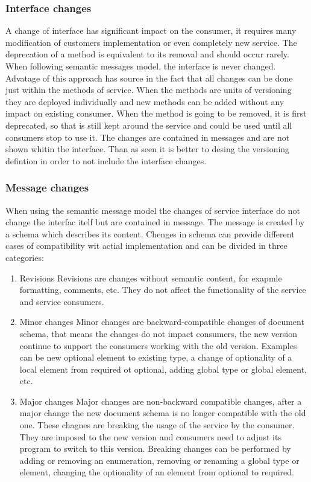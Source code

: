 \subsubsection{Interface changes}
A change of interface has significant impact on the consumer, it requires many modification of customers implementation or even completely new service. The deprecation of a method is equivalent to its removal and should occur rarely.
When following semantic messages model, the interface is never changed. Advatage of this approach has source in the fact that all changes can be done just within the methods of service. When the methods are units of versioning they are deployed individually and new methods can be added without any impact on existing consumer. When the method is going to be removed, it is first deprecated, so that is still kept around the service and could be used until all consumers stop to use it. The changes are contained in messages and are not shown whitin the interface.
Than as seen it is better to desing the versioning defintion in order to not include the interface changes.

\subsubsection{Message changes}
When using the semantic message model the changes of service interface do not change the interfac itelf but are contained in message. The message is created by a schema which describes its content. Chenges in schema can provide different cases of compatibility wit actial implementation and can be divided in three categories:

\begin{enumerate}
  \item Revisions
  Revisions are changes without semantic content, for exapmle formatting, comments, etc. They do not affect the functionality of the service and service consumers.
  
  \item Minor changes
  Minor changes are backward-compatible changes of document schema, that means the changes do not impact consumers, the new version continue to support the consumers working with the old version. Examples can be new optional element to existing type, a change of optionality of a local element from required ot optional, adding global type or global element, etc.
  
  \item Major changes
  Major changes are non-backward compatible changes, after a major change the new document schema is no longer compatible with the old one. These chagnes are breaking the usage of the service by the consumer. They are imposed to the new version and consumers need to adjust its program to switch to this version. Breaking changes can be performed by adding or removing an enumeration, removing or renaming a global type or element, changing the optionality of an element from optional to required.
\end{enumerate} 

